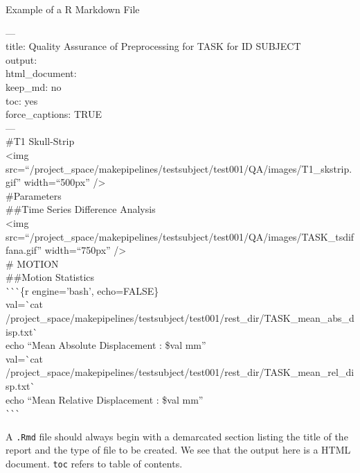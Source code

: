 \begin{bash}{Example of a R Markdown File}{}

--- \\
title: Quality Assurance of Preprocessing for TASK for ID SUBJECT \\
output: \\
  html\_document: \\
    keep\_md: no \\
    toc: yes \\
    force\_captions: TRUE \\
--- \\
\#T1 Skull-Strip \\

<img src=``/project\_space/makepipelines/testsubject/test001/QA/images/T1\_skstrip.gif'' width=``500px'' /> \\

\#Parameters \\

\#\#Time Series Difference Analysis \\

<img src=``/project\_space/makepipelines/testsubject/test001/QA/images/TASK\_tsdiffana.gif'' width=``750px'' /> \\

\# MOTION \\

\#\#Motion Statistics \\

\`{}\`{}\`{}\{r engine='bash', echo=FALSE\} \\
val=\`{}cat /project\_space/makepipelines/testsubject/test001/rest\_dir/TASK\_mean\_abs\_disp.txt\`{} \\
echo ``Mean Absolute Displacement : \$val mm'' \\
val=\`{}cat /project\_space/makepipelines/testsubject/test001/rest\_dir/TASK\_mean\_rel\_disp.txt\`{} \\
echo ``Mean Relative Displacement : \$val mm'' \\
\`{}\`{}\`{} \\

\end{bash}

A \texttt{.Rmd} file should always begin with a demarcated section listing the title of the report and the type of file to be created. We see that the output here is a HTML document. \texttt{toc} refers to table of contents. %


